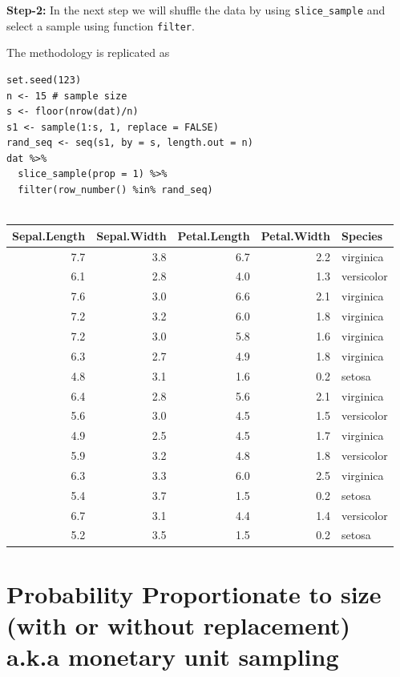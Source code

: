 \documentclass[
]{book}
\begin{document}
\textbf{Step-2:} In the next step we will shuffle the data by using \texttt{slice\_sample} and select a sample using function \texttt{filter}.

The methodology is replicated as

\begin{verbatim}
set.seed(123)
n <- 15 # sample size
s <- floor(nrow(dat)/n)
s1 <- sample(1:s, 1, replace = FALSE)
rand_seq <- seq(s1, by = s, length.out = n)
dat %>% 
  slice_sample(prop = 1) %>% 
  filter(row_number() %in% rand_seq)
  
\end{verbatim}

\begin{tabular}{r|r|r|r|l}
\hline
Sepal.Length & Sepal.Width & Petal.Length & Petal.Width & Species\\
\hline
7.7 & 3.8 & 6.7 & 2.2 & virginica\\
\hline
6.1 & 2.8 & 4.0 & 1.3 & versicolor\\
\hline
7.6 & 3.0 & 6.6 & 2.1 & virginica\\
\hline
7.2 & 3.2 & 6.0 & 1.8 & virginica\\
\hline
7.2 & 3.0 & 5.8 & 1.6 & virginica\\
\hline
6.3 & 2.7 & 4.9 & 1.8 & virginica\\
\hline
4.8 & 3.1 & 1.6 & 0.2 & setosa\\
\hline
6.4 & 2.8 & 5.6 & 2.1 & virginica\\
\hline
5.6 & 3.0 & 4.5 & 1.5 & versicolor\\
\hline
4.9 & 2.5 & 4.5 & 1.7 & virginica\\
\hline
5.9 & 3.2 & 4.8 & 1.8 & versicolor\\
\hline
6.3 & 3.3 & 6.0 & 2.5 & virginica\\
\hline
5.4 & 3.7 & 1.5 & 0.2 & setosa\\
\hline
6.7 & 3.1 & 4.4 & 1.4 & versicolor\\
\hline
5.2 & 3.5 & 1.5 & 0.2 & setosa\\
\hline
\end{tabular}

\hypertarget{probability-proportionate-to-size-with-or-without-replacement-a.k.a-monetary-unit-sampling}{%
\section{Probability Proportionate to size (with or without replacement) a.k.a monetary unit sampling}\label{probability-proportionate-to-size-with-or-without-replacement-a.k.a-monetary-unit-sampling}}
\end{document}
